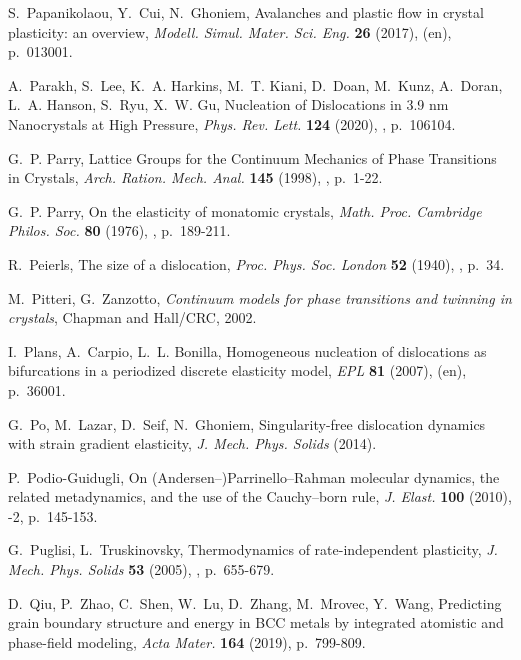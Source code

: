 \documentclass[CRPHYS,Unicode,manuscript]{cedram}
\begin{document}
\begin{thebibliography}{100}
S.~Papanikolaou, Y.~Cui, N.~Ghoniem, {\og Avalanches and plastic flow in
  crystal plasticity: an overview\fg}, \emph{Modell. Simul. Mater. Sci. Eng.}
  \textbf{26} (2017),  (en), p.~013001.

A.~Parakh, S.~Lee, K.~A. Harkins, M.~T. Kiani, D.~Doan, M.~Kunz, A.~Doran,
  L.~A. Hanson, S.~Ryu, X.~W. Gu, {\og Nucleation of Dislocations in 3.9 nm
  Nanocrystals at High Pressure\fg}, \emph{Phys. Rev. Lett.} \textbf{124}
  (2020), , p.~106104.

G.~P. Parry, { Lattice Groups for the Continuum
  Mechanics of Phase Transitions in Crystals\fg}, \emph{Arch. Ration. Mech.
  Anal.} \textbf{145} (1998), , p.~1-22.

G.~P. Parry, {\og On the elasticity of monatomic crystals\fg}, \emph{Math.
  Proc. Cambridge Philos. Soc.} \textbf{80} (1976), , p.~189-211.

R.~Peierls, {\og The size of a dislocation\fg}, \emph{Proc. Phys. Soc. London}
  \textbf{52} (1940), , p.~34.

M.~Pitteri, G.~Zanzotto, \emph{Continuum models for phase transitions and
  twinning in crystals}, Chapman and Hall/CRC, 2002.

I.~Plans, A.~Carpio, L.~L. Bonilla, {\og Homogeneous nucleation of dislocations
  as bifurcations in a periodized discrete elasticity model\fg}, \emph{EPL}
  \textbf{81} (2007),  (en), p.~36001.

G.~Po, M.~Lazar, D.~Seif, N.~Ghoniem, {\og Singularity-free dislocation
  dynamics with strain gradient elasticity\fg}, \emph{J. Mech. Phys. Solids}
  (2014).

P.~Podio-Guidugli, {\og On ({Andersen--)Parrinello--Rahman} molecular dynamics,
  the related metadynamics, and the use of the Cauchy--born rule\fg}, \emph{J.
  Elast.} \textbf{100} (2010), -2, p.~145-153.

G.~Puglisi, L.~Truskinovsky, {\og Thermodynamics of rate-independent
  plasticity\fg}, \emph{J. Mech. Phys. Solids} \textbf{53} (2005), , p.~655-679.

D.~Qiu, P.~Zhao, C.~Shen, W.~Lu, D.~Zhang, M.~Mrovec, Y.~Wang, {\og Predicting
  grain boundary structure and energy in {BCC} metals by integrated atomistic
  and phase-field modeling\fg}, \emph{Acta Mater.} \textbf{164} (2019),
  p.~799-809.


\end{thebibliography}
\end{document}
